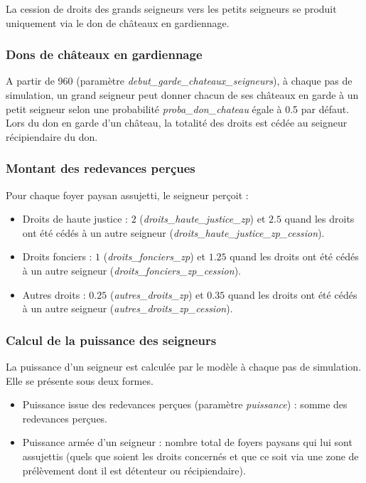 \documentclass[a4paper,11pt]{article}
\begin{document}
{\begin{sloppypar}
La cession de droits des grands seigneurs vers les petits seigneurs se produit uniquement via le don de châteaux en gardiennage.
\end{sloppypar}

\subsubsection{Dons de châteaux en gardiennage}

A partir de 960 (paramètre \textit{debut\_garde\_chateaux\_seigneurs}), à chaque pas de simulation, un grand seigneur peut donner chacun de ses châteaux en garde à un petit seigneur selon une probabilité \textit{proba\_don\_chateau} égale à 0.5 par défaut. Lors du don en garde d'un château, la totalité des droits est cédée au seigneur récipiendaire du don.

\subsubsection{Montant des redevances perçues}
\begin{sloppypar}
Pour chaque foyer paysan assujetti, le seigneur perçoit :
\begin{itemize}
	\item Droits de haute justice : $2$ (\textit{droits\_haute\_justice\_zp}) et $2.5$ quand les droits ont été cédés à un autre seigneur (\textit{droits\_haute\_justice\_zp\_cession}).
	\item Droits fonciers : $1$ (\textit{droits\_fonciers\_zp}) et $1.25$ quand les droits ont été cédés à un autre seigneur (\textit{droits\_fonciers\_zp\_cession}).
	\item Autres droits : $0.25$ (\textit{autres\_droits\_zp}) et $0.35$ quand les droits ont été cédés à un autre seigneur (\textit{autres\_droits\_zp\_cession}).
\end{itemize}
\end{sloppypar}

\subsubsection{Calcul de la puissance des seigneurs}

La puissance d'un seigneur est calculée par le modèle à chaque pas de simulation. Elle se présente sous deux formes. 
\begin{itemize}
\item Puissance issue des redevances perçues (paramètre \textit{puissance}) : somme des redevances perçues.
\item Puissance armée d'un seigneur : nombre total de foyers paysans qui lui sont assujettis (quels que soient les droits concernés et que ce soit via une zone de prélèvement dont il est détenteur ou récipiendaire).
\end{itemize}


}
\end{document}
